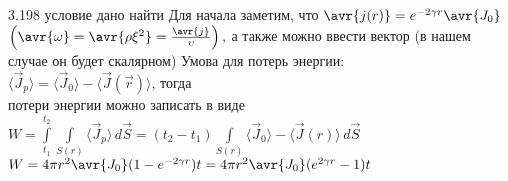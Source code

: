 \testCom
{%
	3.198
}
{%
	условие
}
{%
	дано
}
{%
	найти
}
{%
	Для начала заметим, что $\avr{j(r)} = e^{-2 \gamma r} \avr{J_0}$\\
	$\left( \avr{\omega} = \avr{\rho \xi^2} = \frac{\avr{j}}{\upsilon} \right),$ а также можно ввести вектор (в нашем случае он будет скалярном) Умова для потерь энергии:\\
	$\langle \vec J_p \rangle = \langle \vec J_0 \rangle - \langle \vec J(\vec r) \rangle$, тогда \\
	потери энергии можно записать в виде\\
	$W = \int\limits_{t_1}^{t_2} \int\limits_{S(r)} \langle \vec J_p \rangle \, d\vec S = (t_2 - t_1) \int\limits_{S(r)} \langle \vec J_0 \rangle - \langle \vec J(r) \rangle \, d \vec S$\\
	$W = 4 \pi r^2 \avr{J_0} (1 - e^{-2 \gamma r}) t = 4 \pi r^2 \avr{J_0} (e^{2 \gamma r} - 1) t$\\
}


